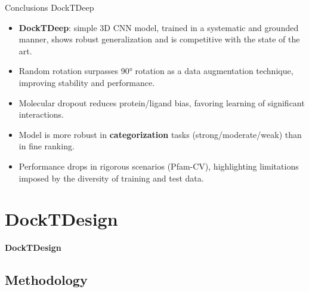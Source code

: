 \documentclass[aspectratio=169,xcolor=dvipsnames]{beamer}
\begin{document}
\begin{frame}{Conclusions \hfill {\footnotesize \alert{DockTDeep}}}

    \begin{itemize}
        \item \textbf{DockTDeep}: simple 3D CNN model, trained in a systematic and grounded manner, shows robust generalization and is competitive with the state of the art.

        \item Random rotation surpasses 90° rotation as a data augmentation technique, improving stability and performance.

        \item Molecular dropout reduces protein/ligand bias, favoring learning of significant interactions.

        \item Model is more robust in \textbf{categorization} tasks (strong/moderate/weak) than in fine ranking.

        \item Performance drops in rigorous scenarios (Pfam-CV), highlighting limitations imposed by the diversity of training and test data.
    \end{itemize}

\end{frame}






\section{DockTDesign}
\begin{frame}  %
    \Large{\centerline{\textbf{DockTDesign}}}
\end{frame}



\subsection{Methodology}
\end{document}
